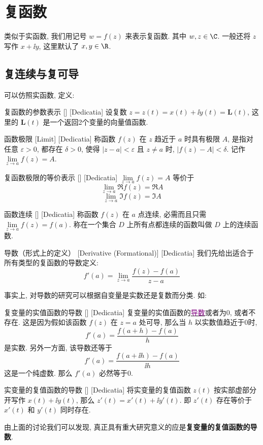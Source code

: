 \documentclass[UTF8]{ctexart}
\newcommand{\hyperrefc}[2]{\hyperref[#1]{\textcolor{purple}{#2}}}
\begin{document}
\section{复函数}
类似于实函数, 我们用记号 \( w=f(z) \) 来表示复函数. 其中 \( w,z\in\C \). 一般还将 \( z \) 写作 \( x+\ii y \), 这里默认了 \( x,y\in\R \). 
\subsection{复连续与复可导}
可以仿照实函数, 定义: 
\begin{dfn}
    [UUID]
    {复函数的参数表示}
    []
    [Dedicatia]
    设复数 \( z=z(t)=x(t)+\ii y(t)=\bm{L}(t) \), 这里的 \( \bm{L}(t) \) 是一个返回2个变量的向量值函数. 
\end{dfn}
\begin{dfn}
    [UUID]
    {函数极限}
    [Limit]
    [Dedicatia]
    称函数 \( f(z) \) 在 \( z \) 趋近于 \( a \) 时具有极限 \( A \), 是指对任意 \( \varepsilon>0 \), 都存在 \( \delta>0 \), 使得 \( |z-a|<\varepsilon \) 且 \( z\neq a \) 时,  \( |f(z)-A|<\delta \). 记作 \( \lim\limits_{z\to a}f(z)=A \).
\end{dfn}
\begin{ppt}
    [UUID]
    {复函数极限的等价表示}
    []
    [Dedicatia]
     \( \lim\limits_{z\to a}f(z)=A \) 等价于
    \[\lim_{z\to a}\Re f(z)=\Re A\]
    \[\lim_{z\to a}\Im f(z)=\Im A\]
\end{ppt}
\begin{dfn}
    [UUID]
    {函数连续}
    []
    [Dedicatia]
    称函数 \( f(z) \) 在 \( a \) 点连续, 必需而且只需 \( \lim\limits_{z\to a}f(z)=f(a) \). 称在一个集合 \( D \) 上所有点都连续的函数叫做 \( D \) 上的连续函数. 
\end{dfn}
\begin{dfn}
    [Derivative]
    {导数（形式上的定义）}
    [Derivative (Formational)]
    [Dedicatia]
    我们先给出适合于所有类型的复函数的导数定义: 
    \[f'(a)=\lim_{z\to a}\frac{f(z)-f(a)}{z-a}\]
\end{dfn}
事实上, 对导数的研究可以根据自变量是实数还是复数而分类. 如:
\begin{crl}
    [UUID]
    {复变量的实值函数的导数}
    []
    [Dedicatia]
    复变量的实值函数的\hyperrefc{dfn:Derivative}{导数}或者为0, 或者不存在. 这是因为假如该函数 \( f(z) \) 在 \( z=a \) 处可导, 那么当 \( h \) 以实数值趋近于0时, 
    \[f'(a)=\frac{f(a+h)-f(a)}{h}\]
    是实数. 另外一方面, 该导数还等于
    \[f'(a)=\frac{f(a+\ii h)-f(a)}{\ii h}\]
    这是一个纯虚数. 那么 \( f'(a) \) 必然等于0.
\end{crl}
\begin{xmp}
    [UUID]
    {实变量的复值函数的导数}
    []
    [Dedicatia]
    将实变量的复值函数 \( z(t) \) 按实部虚部分开写作 \( x(t)+\ii y(t) \), 那么 \( z'(t)=x'(t)+\ii y'(t) \). 即 \( z'(t) \) 存在等价于 \( x'(t) \) 和 \( y'(t) \) 同时存在. 
\end{xmp}
由上面的讨论我们可以发现, 真正具有重大研究意义的应是\textbf{复变量的复值函数的导数}. 
\end{document}
